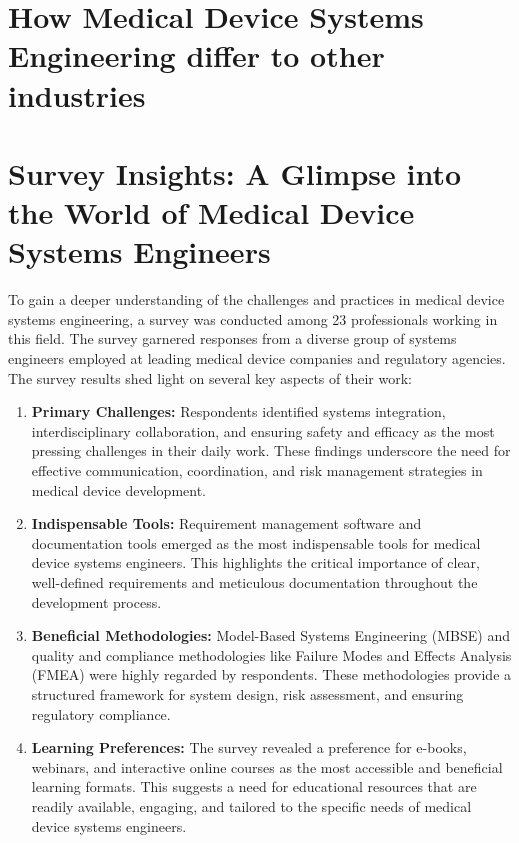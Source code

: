 \documentclass[conference]{IEEEtran}
\begin{document}
\section{How Medical Device Systems Engineering differ to other industries}

\section{Survey Insights: A Glimpse into the World of Medical Device Systems Engineers}


    To gain a deeper understanding of the challenges and practices 
    in medical device systems engineering, a survey was conducted 
    among 23 professionals working in this field. The survey 
    garnered responses from a diverse group of systems engineers 
    employed at leading medical device companies and regulatory 
    agencies. The survey results shed light on several key aspects 
    of their work:

    \begin{enumerate}

        \item \textbf{Primary Challenges:} Respondents identified systems 
        integration, interdisciplinary collaboration, and ensuring safety 
        and efficacy as the most pressing challenges in their daily work. 
        These findings underscore the need for effective communication, 
        coordination, and risk management strategies in medical device 
        development.
    
        \item \textbf{Indispensable Tools:} Requirement management software 
        and documentation tools emerged as the most indispensable tools 
        for medical device systems engineers. This highlights the critical 
        importance of clear, well-defined requirements and meticulous 
        documentation throughout the development process.
    
        \item \textbf{Beneficial Methodologies:} Model-Based Systems 
        Engineering (MBSE) and quality and compliance methodologies like 
        Failure Modes and Effects Analysis (FMEA) were highly regarded 
        by respondents. These methodologies provide a structured framework 
        for system design, risk assessment, and ensuring regulatory 
        compliance.
    
        \item \textbf{Learning Preferences:} The survey revealed a 
        preference for e-books, webinars, and interactive online courses 
        as the most accessible and beneficial learning formats. This suggests 
        a need for educational resources that are readily available, 
        engaging, and tailored to the specific needs of medical device 
        systems engineers.

    \end{enumerate}
\end{document}
